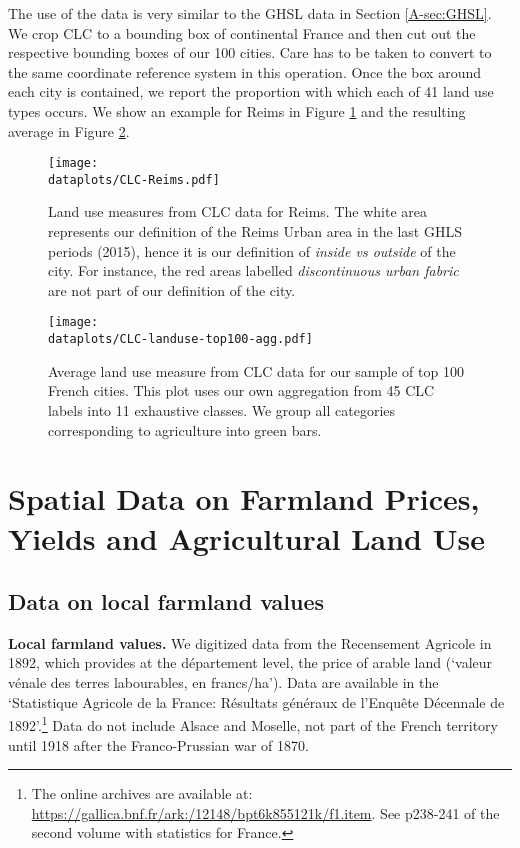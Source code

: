 \documentclass[11pt]{report}
\newcommand{\dataplots}{../../output/data/plots}
\begin{document}
The use of the data is very similar to the GHSL data in Section \ref{A-sec:GHSL}. We crop CLC to a bounding box of continental France and then cut out the respective bounding boxes of our 100 cities. Care has to be taken to convert to the same coordinate reference system in this operation. Once the box around each city is contained, we report the proportion with which each of 41 land use types occurs. We show an example for Reims in Figure \ref{A-fig:CLC-paris} and the resulting average in Figure \ref{A-fig:CLC}.

\begin{figure}[h!]
	\centering
	\texttt{[image: \\dataplots/CLC-Reims.pdf]}
	\caption{Land use measures from CLC data for Reims. The white area represents our definition of the Reims Urban area in the last GHLS periods (2015), hence it is our definition of \emph{inside vs outside} of the city. For instance, the red areas labelled \emph{discontinuous urban fabric} are not part of our definition of the city.\label{A-fig:CLC-paris}}
\end{figure}


\begin{figure}[h!]
	\texttt{[image: \\dataplots/CLC-landuse-top100-agg.pdf]}
	\caption{Average land use measure from CLC data for our sample of top 100 French cities. This plot uses our own aggregation from 45 CLC labels into 11 exhaustive classes. We group all categories corresponding to agriculture into green bars.\label{A-fig:CLC}}
\end{figure}

\newpage

\section{Spatial Data on Farmland Prices, Yields and Agricultural Land Use}\label{A-sec:spatialagri}

\subsection{Data on local farmland values}\label{A-sec:PRA}

\noindent \textbf{Local farmland values.} We digitized data from the Recensement Agricole in 1892, which provides at the département level, the price of arable land (`valeur vénale des terres labourables, en francs/ha'). Data are available in the `Statistique Agricole de la France: Résultats généraux de l'Enquête Décennale de 1892'.\footnote{The online archives are available at:  \url{https://gallica.bnf.fr/ark:/12148/bpt6k855121k/f1.item}. See p238-241 of the second volume with statistics for France.} Data do not include Alsace and Moselle, not part of the French territory until 1918 after the Franco-Prussian war of 1870.
\end{document}
